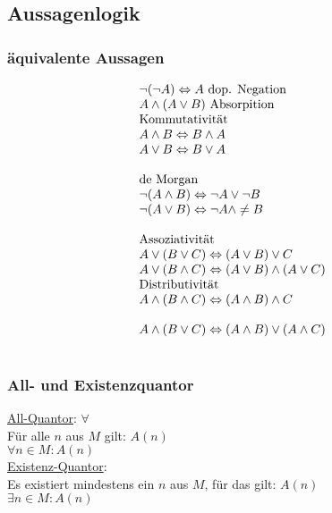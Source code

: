 \subsection*{Aussagenlogik}

\subsubsection*{äquivalente Aussagen}
\begin{adjustwidth}{-0.3cm}{0pt}
\begin{align*}
    \begin{array}{l}
        \neg(\neg A) \Leftrightarrow A \text{ dop. Negation} \\
        A \land (A \lor B)  \text{ Absorpition} \\
        \text{Kommutativität} \\
        A \land B \Leftrightarrow B \land A \\ 
        A \lor B \Leftrightarrow B \lor A \\ \text{} \\
        \text{de Morgan} \\
        \neg (A \land B)    \Leftrightarrow \neg A \lor \neg B \\ 
        \neg (A \lor B)     \Leftrightarrow \neg A \land \neq B \\ \text{} \\
        \text{Assoziativität} \\
        A \lor (B \lor C)   \Leftrightarrow (A \lor B) \lor C \\ 
        A \lor (B \land C)  \Leftrightarrow (A \lor B) \land (A \lor C) \\ \text{Distributivität} \\
        A \land (B \land C) \Leftrightarrow (A \land B) \land C \\ \text{} \\
        A \land (B \lor C)  \Leftrightarrow (A \land B) \lor (A \land C) \\ \text{} \\
    \end{array}
\end{align*}
\end{adjustwidth}

\subsubsection*{All- und Existenzquantor}
\underline{All-Quantor}: $\forall$\\
\glqq Für alle $n$ aus $M$ gilt: $A(n)$\grqq\\
$\forall n \in M: A(n)$\\
\underline{Existenz-Quantor}:\\
\glqq Es existiert mindestens ein $n$ aus $M$, für das gilt: $A(n)$\grqq\\
$\exists n \in M: A(n)$
